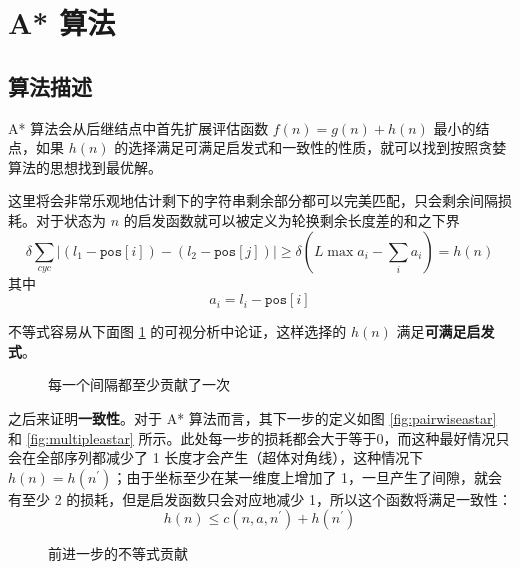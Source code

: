     \section{A* 算法}

    \subsection{算法描述}

    A* 算法会从后继结点中首先扩展评估函数 $f(n)=g(n)+h(n)$ 最小的结点，如果 $h(n)$ 的选择满足可满足启发式和一致性的性质，就可以找到按照贪婪算法的思想找到最优解。

    这里将会非常乐观地估计剩下的字符串剩余部分都可以完美匹配，只会剩余间隔损耗。对于状态为 $n$ 的启发函数就可以被定义为轮换剩余长度差的和之下界
    \begin{equation*}
        \delta\sum_{cyc} \left|(l_1-\texttt{pos}[i])-(l_2-\texttt{pos}[j])\right| \geq \delta \left(L\max a_i - \sum_i a_i\right) = h(n)
    \end{equation*}
    其中
    \begin{equation*}
        a_i = l_i - \texttt{pos}[i]
    \end{equation*}


    不等式容易从下面图 \ref{fig:gap} 的可视分析中论证，这样选择的 $h(n)$ 满足\textbf{可满足启发式}。

    \begin{figure}[H]
        \centering
        
        \caption{每一个间隔都至少贡献了一次}\label{fig:gap}
    \end{figure}

    之后来证明\textbf{一致性}。对于 A* 算法而言，其下一步的定义如图 \ref{fig:pairwiseastar} 和 \ref{fig:multipleastar} 所示。此处每一步的损耗都会大于等于0，而这种最好情况只会在全部序列都减少了 1 长度才会产生（超体对角线），这种情况下$h(n)=h(n^\prime)$；由于坐标至少在某一维度上增加了 1，一旦产生了间隙，就会有至少 2 的损耗，但是启发函数只会对应地减少 1，所以这个函数将满足一致性：
    \begin{equation*}
        h(n)\leq c(n,a,n^\prime) + h(n^\prime)
    \end{equation*}

    \begin{figure}[H]
        \centering
        
        \caption{前进一步的不等式贡献}\label{fig:gaptri}
    \end{figure}

